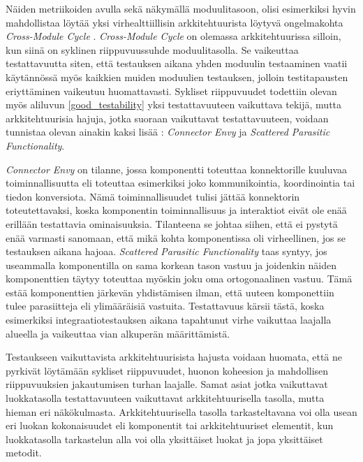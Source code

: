 \documentclass[finnish]{tktltiki2}
\numberwithin{table}{section}
\theoremstyle{definition}
\theoremstyle{remark}
\begin{document}

\noindent
Näiden metriikoiden avulla sekä näkymällä moduulitasoon, olisi esimerkiksi hyvin mahdollistaa löytää yksi virhealttiillisin arkkitehtuurista löytyvä ongelmakohta \textit{Cross-Module Cycle} \citep[s. 57]{HotSpot}. \textit{Cross-Module Cycle} on olemassa arkkitehtuurissa silloin, kun siinä on syklinen riippuvuussuhde moduulitasolla. Se vaikeuttaa testattavuutta siten, että testauksen aikana yhden moduulin testaaminen vaatii käytännössä myös kaikkien muiden moduulien testauksen, jolloin testitapausten eriyttäminen vaikeutuu huomattavasti. Sykliset riippuvuudet todettiin olevan myös aliluvun \ref{good_testability} yksi testattavuuteen vaikuttava tekijä, mutta arkkitehtuurisia hajuja, jotka suoraan vaikuttavat testattavuuteen, voidaan tunnistaa olevan ainakin kaksi lisää \citep{garcia_identifying_2009}:  \textit{Connector Envy} ja \textit{Scattered Parasitic Functionality}.

\textit{Connector Envy} on tilanne, jossa komponentti toteuttaa konnektorille kuuluvaa toiminnallisuutta eli toteuttaa esimerkiksi joko kommunikointia, koordinointia tai tiedon konversiota. Nämä toiminnallisuudet tulisi jättää konnektorin toteutettavaksi, koska komponentin toiminnallisuus ja interaktiot eivät ole enää erillään testattavia ominaisuuksia. Tilanteena se johtaa siihen, että ei pystytä enää varmasti sanomaan, että mikä kohta komponentissa oli virheellinen, jos se testauksen aikana hajoaa. \textit{Scattered Parasitic Functionality} taas syntyy, jos useammalla komponentilla on sama korkean tason vastuu ja joidenkin näiden komponenttien täytyy toteuttaa myöskin joku oma ortogonaalinen vastuu. Tämä estää komponenttien järkevän yhdistämisen ilman, että uuteen komponettiin tulee parasiitteja eli ylimääräisiä vastuita. Testattavuus kärsii tästä, koska esimerkiksi integraatiotestauksen aikana tapahtunut virhe vaikuttaa laajalla alueella ja vaikeuttaa vian alkuperän määrittämistä. 

Testaukseen vaikuttavista arkkitehtuurisista hajusta voidaan huomata, että ne pyrkivät löytämään sykliset riippuvuudet, huonon koheesion ja mahdollisen riippuvuuksien jakautumisen turhan laajalle. Samat asiat jotka vaikuttavat luokkatasolla testattavuuteen vaikuttavat arkkitehtuurisella tasolla, mutta hieman eri näkökulmasta. Arkkitehtuurisella tasolla tarkasteltavana voi olla usean eri luokan kokonaisuudet eli komponentit tai arkkitehtuuriset elementit, kun luokkatasolla tarkastelun alla voi olla yksittäiset luokat ja jopa yksittäiset metodit.
\end{document}
